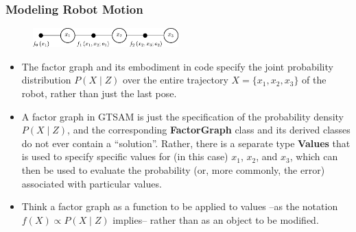 \begin{frame}
    \frametitle{Modeling Robot Motion}


    \begin{figure}[!h]
        \includegraphics[width=0.5\textwidth]{./images/gtsam/factor_graph_odometry.pdf}
    \end{figure}

    \begin{itemize}
        \item The factor graph and its embodiment in code specify the joint probability distribution $P(X \mid Z)$ over the entire trajectory $ X = \{ x_1,x_2,x_3 \}$ of the robot, rather than just the last pose.
        \item A factor graph in GTSAM is just the specification of the probability density $P(X \mid Z)$, and the corresponding \textbf{FactorGraph} class and its derived classes do not ever contain a ``solution''. Rather, there is a separate type \textbf{Values} that is used to specify specific values for (in this case) $x_1$, $x_2$, and $x_3$, which can then be used to evaluate the probability (or, more commonly, the error) associated with particular values.
        \item Think a factor graph as a function to be applied to values --as the notation $f(X) \propto P(X \mid Z)$ implies-- rather than as an object to be modified.
    \end{itemize}

\end{frame}

